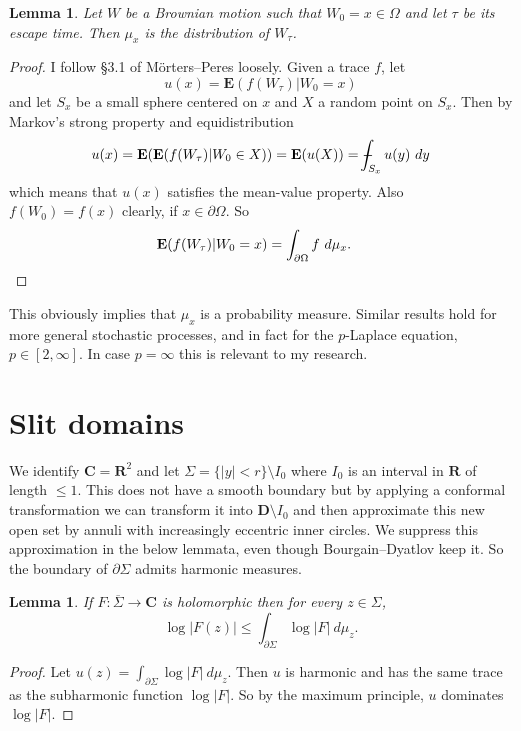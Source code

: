 \documentclass[reqno,12pt,letterpaper]{amsart}
\newcommand{\RR}{\mathbf{R}}
\newcommand{\CC}{\mathbf{C}}
\newcommand{\DD}{\mathbf{D}}
\newcommand{\Expect}{\mathbf E}
\newtheorem{lemma}[theorem]{Lemma}
\theoremstyle{definition}
\numberwithin{equation}{section}
\def\Xint#1{\mathchoice
{\XXint\displaystyle\textstyle{#1}}%
{\XXint\textstyle\scriptstyle{#1}}%
{\XXint\scriptstyle\scriptscriptstyle{#1}}%
{\XXint\scriptscriptstyle\scriptscriptstyle{#1}}%
\!\int}
\def\XXint#1#2#3{{\setbox0=\hbox{$#1{#2#3}{\int}$ }
\vcenter{\hbox{$#2#3$ }}\kern-.6\wd0}}
\def\dashint{\Xint-}
\begin{document}
\begin{lemma}
Let $W$ be a Brownian motion such that $W_0 = x \in \Omega$ and let $\tau$ be its escape time.
Then $\mu_x$ is the distribution of $W_\tau$.
\end{lemma}
\begin{proof}
I follow \S3.1 of M\"orters--Peres loosely.
Given a trace $f$, let
$$u(x) = \Expect(f(W_\tau)|W_0 = x)$$
and let $S_x$ be a small sphere centered on $x$ and $X$ a random point on $S_x$.
Then by Markov's strong property and equidistribution
$$u(x) = \Expect(\Expect(f(W_\tau)|W_0 \in X)) = \Expect(u(X)) = \dashint_{S_x} u(y) ~dy$$
which means that $u(x)$ satisfies the mean-value property.
Also $f(W_0) = f(x)$ clearly, if $x \in \partial \Omega$.
So
\begin{align*}
\Expect(f(W_\tau)|W_0 = x) &= \int_{\partial \Omega} f ~d\mu_x. \qedhere
\end{align*}
\end{proof}

This obviously implies that $\mu_x$ is a probability measure.
Similar results hold for more general stochastic processes, and in fact for the $p$-Laplace equation, $p \in [2, \infty]$.
In case $p = \infty$ this is relevant to my research.

\section{Slit domains}
We identify $\CC = \RR^2$ and let $\Sigma = \{|y| < r\} \setminus I_0$ where $I_0$ is an interval in $\RR$ of length $\leq 1$.
This does not have a smooth boundary but by applying a conformal transformation we can transform it into $\DD \setminus I_0$ and then approximate this new open set by annuli with increasingly eccentric inner circles.
We suppress this approximation in the below lemmata, even though Bourgain--Dyatlov keep it.
So the boundary of $\partial \Sigma$ admits harmonic measures.

\begin{lemma}
If $F: \overline \Sigma \to \CC$ is holomorphic then for every $z \in \Sigma$,
$$\log |F(z)| \leq \int_{\partial \Sigma} \log |F| ~d\mu_z.$$
\end{lemma}
\begin{proof}
Let $u(z) = \int_{\partial \Sigma} \log |F| ~d\mu_z$. Then $u$ is harmonic and has the same trace as the subharmonic function $\log |F|$.
So by the maximum principle, $u$ dominates $\log |F|$.
\end{proof}
\end{document}
